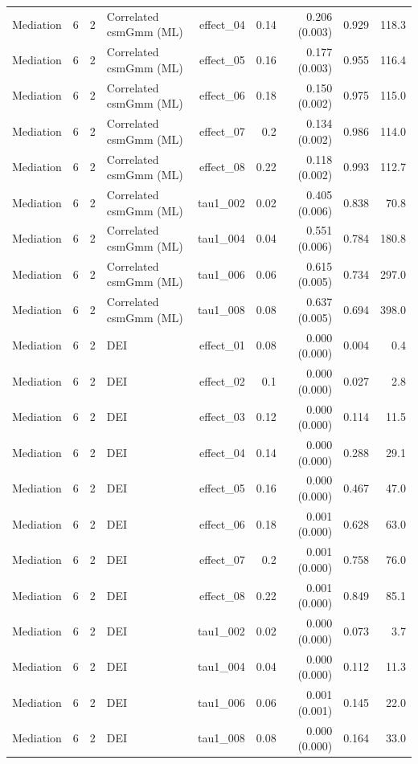 \begin{longtable}{lcclrrrrr}
Mediation & 6 & 2 & Correlated csmGmm (ML) & effect\_04 & 0.14 & 0.206 (0.003) & 0.929 & 118.3\\
Mediation & 6 & 2 & Correlated csmGmm (ML) & effect\_05 & 0.16 & 0.177 (0.003) & 0.955 & 116.4\\
Mediation & 6 & 2 & Correlated csmGmm (ML) & effect\_06 & 0.18 & 0.150 (0.002) & 0.975 & 115.0\\
Mediation & 6 & 2 & Correlated csmGmm (ML) & effect\_07 & 0.2 & 0.134 (0.002) & 0.986 & 114.0\\
Mediation & 6 & 2 & Correlated csmGmm (ML) & effect\_08 & 0.22 & 0.118 (0.002) & 0.993 & 112.7\\
Mediation & 6 & 2 & Correlated csmGmm (ML) & tau1\_002 & 0.02 & 0.405 (0.006) & 0.838 & 70.8\\
Mediation & 6 & 2 & Correlated csmGmm (ML) & tau1\_004 & 0.04 & 0.551 (0.006) & 0.784 & 180.8\\
Mediation & 6 & 2 & Correlated csmGmm (ML) & tau1\_006 & 0.06 & 0.615 (0.005) & 0.734 & 297.0\\
Mediation & 6 & 2 & Correlated csmGmm (ML) & tau1\_008 & 0.08 & 0.637 (0.005) & 0.694 & 398.0\\
Mediation & 6 & 2 & DEI & effect\_01 & 0.08 & 0.000 (0.000) & 0.004 & 0.4\\
Mediation & 6 & 2 & DEI & effect\_02 & 0.1 & 0.000 (0.000) & 0.027 & 2.8\\
Mediation & 6 & 2 & DEI & effect\_03 & 0.12 & 0.000 (0.000) & 0.114 & 11.5\\
Mediation & 6 & 2 & DEI & effect\_04 & 0.14 & 0.000 (0.000) & 0.288 & 29.1\\
Mediation & 6 & 2 & DEI & effect\_05 & 0.16 & 0.000 (0.000) & 0.467 & 47.0\\
Mediation & 6 & 2 & DEI & effect\_06 & 0.18 & 0.001 (0.000) & 0.628 & 63.0\\
Mediation & 6 & 2 & DEI & effect\_07 & 0.2 & 0.001 (0.000) & 0.758 & 76.0\\
Mediation & 6 & 2 & DEI & effect\_08 & 0.22 & 0.001 (0.000) & 0.849 & 85.1\\
Mediation & 6 & 2 & DEI & tau1\_002 & 0.02 & 0.000 (0.000) & 0.073 & 3.7\\
Mediation & 6 & 2 & DEI & tau1\_004 & 0.04 & 0.000 (0.000) & 0.112 & 11.3\\
Mediation & 6 & 2 & DEI & tau1\_006 & 0.06 & 0.001 (0.001) & 0.145 & 22.0\\
Mediation & 6 & 2 & DEI & tau1\_008 & 0.08 & 0.000 (0.000) & 0.164 & 33.0\\

\end{longtable}
